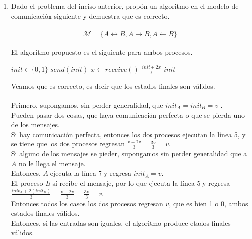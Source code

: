 \documentclass[12pt,a4paper]{report}
\begin{document}
\begin{enumerate}
{
	}
	\item {
	Dado el problema del inciso anterior, propón un algoritmo en el modelo de
	comunicación siguiente y demuestra que es correcto.\\\\
		\begin{equation*}
			\mathcal{M} = \{A \leftrightarrow B, A \rightarrow B, A \leftarrow B \}
		\end{equation*}\\
	El algoritmo propuesto es el siguiente para ambos procesos.\\
		\begin{algorithm}[1]
			\Require $init \in \{0, 1\}$
				\State $send(init)$
				\State $x \gets receive()$
					\State \Return $\frac{init + 2x}{3}$
				\Else
					\State \Return $init$
				\EndIf
			\EndFunction
		\end{algorithm}

	Veamos que es correcto, es decir que los estados finales son válidos.\\\\

	Primero, supongamos, sin perder generalidad, que $init_A = init_B = v$ .\\
	Pueden pasar dos cosas, que haya comunicación perfecta o que se pierda uno
	de los mensajes.\\
	Si hay comunicación perfecta, entonces los dos procesos ejecutan la línea 5,
	y se tiene que los dos procesos regresan $\frac{v + 2v}{3} = \frac{3v}{3} = v$.\\
	Si alguno de los mensajes se pieder, supongamos sin perder generalidad que a $A$
	no le llega el mensaje.\\
	Entonces, $A$ ejecuta la línea 7 y regresa $init_A = v$.\\
	El proceso $B$ sí recibe el mensaje, por lo que ejecuta la línea 5 y regresa
	$\frac{init_A + 2 (init_B)}{3} = \frac{v + 2v}{3} = \frac{3v}{3} = v$.\\
	Entonces todos los casos los dos procesos regresan $v$, que es bien 1 o 0,
	ambos estados finales válidos.\\
	Entonces, si las entradas son iguales, el algoritmo produce etados finales válidos.\\\\

}
\end{enumerate}
\end{document}
